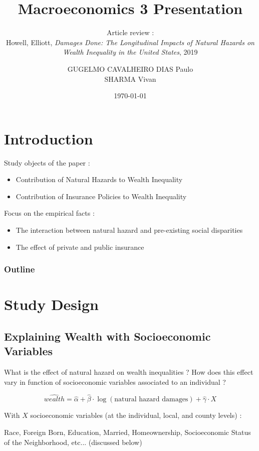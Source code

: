 \documentclass{beamer}
\title{Macroeconomics 3 Presentation}
\subtitle{Article review :  \\ Howell, Elliott, 
\textit{Damages Done: The Longitudinal Impacts of Natural Hazards on Wealth Inequality in the United States}, 2019}
\author{GUGELMO CAVALHEIRO DIAS Paulo \\ SHARMA Vivan}
\institute{Sciences Po}
\date{\today}
\begin{document}
\begin{frame}
    \titlepage
\end{frame}


\section{Introduction}

\begin{frame}{\secname}
    Study objects of the paper : 
    \begin{itemize}
        \item Contribution of Natural Hazards to Wealth Inequality
        \item Contribution of Insurance Policies to Wealth Inequality
    \end{itemize}
    Focus on the empirical facts : 
    \begin{itemize}
        \item The interaction between natural hazard and pre-existing social disparities
        \item The effect of private and public insurance
    \end{itemize}
\end{frame}

\begin{frame}
    \frametitle{Outline}
    \tableofcontents[hideallsubsections]
\end{frame}

\section{Study Design}

\subsection{Explaining Wealth with Socioeconomic Variables}
\begin{frame}{\subsecname}
    What is the effect of natural hazard on wealth inequalities ? 
    How does this effect vary in function of socioeconomic variables associated to an individual ? 

    \begin{equation*}
        \widehat{wealth} = \widehat{\alpha} + \widehat{\beta} \cdot \log(\text{natural hazard damages}) + \widehat{\gamma} \cdot X
    \end{equation*}

    With $X$ socioeconomic variables (at the individual, local, and county levels) :

    Race, Foreign Born, Education, Married, Homeownership, Socioeconomic Status of the Neighborhood, etc...
    (discussed below)
\end{frame}
\end{document}
